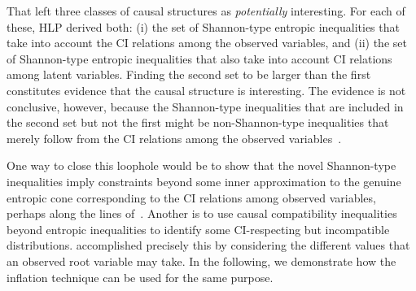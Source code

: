 \documentclass[aps,english,10pt,superscriptaddress,onecolumn,twoside,longbibliography,pra,floatfix,fleqn,nofootinbib]{revtex4-1}
\theoremstyle{definition}
\begin{document}
That left three classes of causal structures  as \emph{potentially} interesting. For each of these, HLP
 derived both: (i) the set of Shannon-type entropic inequalities that take into account the CI relations among the observed variables, and (ii)  the set of Shannon-type entropic inequalities that also take into account CI relations among latent variables.
Finding the second set to be larger than the first constitutes evidence that the causal structure is interesting.
The evidence is not conclusive, however, because the Shannon-type inequalities that are included in the second set but not the first might be non-Shannon-type inequalities that merely follow from the CI relations among the observed variables~\cite{pusey2014gdag}.

One way to close this loophole would be to show that the novel Shannon-type inequalities imply constraints beyond some inner approximation to the genuine entropic cone corresponding to the CI relations among observed variables, perhaps along the lines of~\cite{weilenmann2016entropic}. Another is to use causal compatibility inequalities beyond entropic inequalities to identify some CI-respecting but incompatible distributions. \citet{pianaar2016interesting} accomplished precisely this
by considering the different values that an observed root variable may take. In the following, we demonstrate how the inflation technique can be used for the same purpose. 
\end{document}
